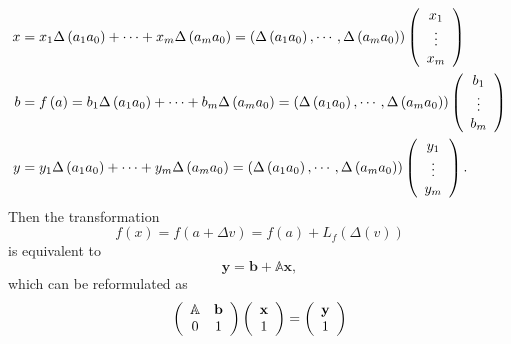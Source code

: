 \documentclass[aps,preprint]{revtex4}%
\begin{document}
\begin{align}
x  &  =x_{1}\Delta\left(  a_{1}a_{0}\right)  +\cdots+x_{m}\Delta\left(
a_{m}a_{0}\right)  =\left(  \Delta\left(  a_{1}a_{0}\right)  ,\cdots
,\Delta\left(  a_{m}a_{0}\right)  \right)  \left(
\begin{array}
[c]{c}%
x_{1}\\
\vdots\\
x_{m}%
\end{array}
\right) \\
b  &  =f\left(  a\right)  =b_{1}\Delta\left(  a_{1}a_{0}\right)  +\cdots
+b_{m}\Delta\left(  a_{m}a_{0}\right)  =\left(  \Delta\left(  a_{1}%
a_{0}\right)  ,\cdots,\Delta\left(  a_{m}a_{0}\right)  \right)  \left(
\begin{array}
[c]{c}%
b_{1}\\
\vdots\\
b_{m}%
\end{array}
\right) \\
y  &  =y_{1}\Delta\left(  a_{1}a_{0}\right)  +\cdots+y_{m}\Delta\left(
a_{m}a_{0}\right)  =\left(  \Delta\left(  a_{1}a_{0}\right)  ,\cdots
,\Delta\left(  a_{m}a_{0}\right)  \right)  \left(
\begin{array}
[c]{c}%
y_{1}\\
\vdots\\
y_{m}%
\end{array}
\right)  .
\end{align}
Then the transformation
\begin{equation}
f\left(  x\right)  =f\left(  a+\Delta v\right)  =f\left(  a\right)
+L_{f}\left(  \Delta\left(  v\right)  \right)
\end{equation}
is equivalent to
\begin{equation}
\mathbf{y}=\mathbf{b}+\mathbb{A}\mathbf{x,}%
\end{equation}
which can be reformulated as
\begin{equation}
\left(
\begin{array}
[c]{cc}%
\mathbb{A} & \mathbf{b}\\
0 & 1
\end{array}
\right)  \left(
\begin{array}
[c]{c}%
\mathbf{x}\\
1
\end{array}
\right)  =\left(
\begin{array}
[c]{c}%
\mathbf{y}\\
1
\end{array}
\right)
\end{equation}
\end{document}
